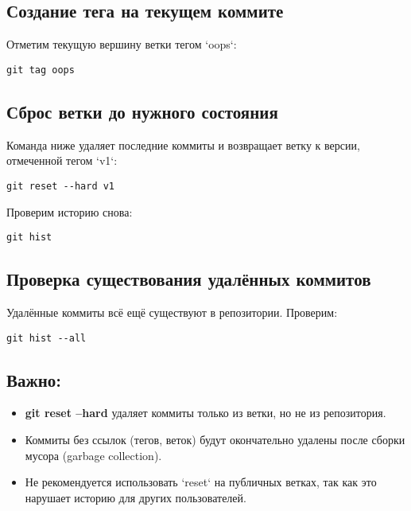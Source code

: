 \documentclass[a4paper,12pt]{report}
\begin{document}

\subsection*{Создание тега на текущем коммите}
Отметим текущую вершину ветки тегом `oops`:
\begin{verbatim}
git tag oops
\end{verbatim}

\subsection*{Сброс ветки до нужного состояния}
Команда ниже удаляет последние коммиты и возвращает ветку к версии, отмеченной тегом `v1`:
\begin{verbatim}
git reset --hard v1
\end{verbatim}

Проверим историю снова:
\begin{verbatim}
git hist
\end{verbatim}


\subsection*{Проверка существования удалённых коммитов}
Удалённые коммиты всё ещё существуют в репозитории. Проверим:
\begin{verbatim}
git hist --all
\end{verbatim}


\subsection*{Важно:}
\begin{itemize}
  \item \textbf{git reset --hard} удаляет коммиты только из ветки, но не из репозитория.
  \item Коммиты без ссылок (тегов, веток) будут окончательно удалены после сборки мусора (garbage collection).
  \item Не рекомендуется использовать `reset` на публичных ветках, так как это нарушает историю для других пользователей.
\end{itemize}
\end{document}
